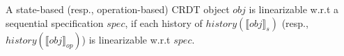 \begin{definition}
\label{definition:correctness of a CRDT object} 
A state-based (resp., operation-based) CRDT object $\mathit{obj}$ is linearizable w.r.t a sequential specification $\mathit{spec}$, if each history of $\mathit{history}(\llbracket \mathit{obj} \rrbracket_s)$ (resp., $\mathit{history}(\llbracket \mathit{obj} \rrbracket_{\mathit{op}})$) is linearizable w.r.t $\mathit{spec}$. 
\end{definition}





















